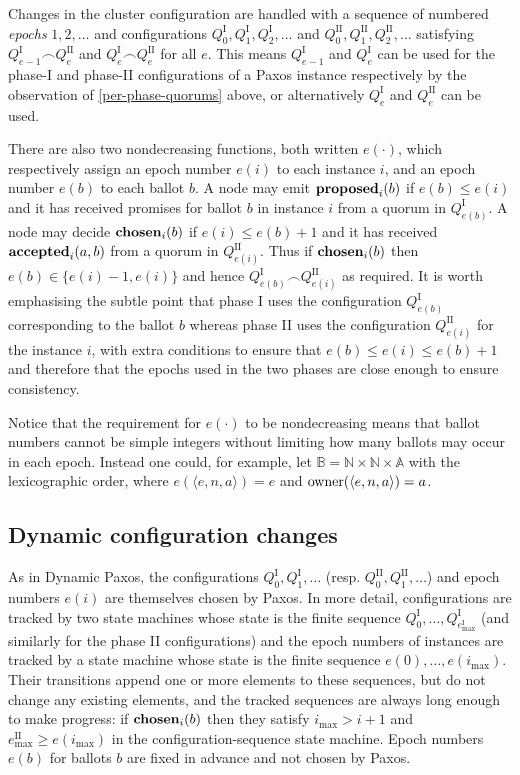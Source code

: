 \documentclass[journal]{IEEEtran}
\begin{document}
Changes in the cluster configuration are handled with a sequence of numbered
\textit{epochs} $1, 2, \ldots$ and configurations $Q^\textrm{I}_0,
Q^\textrm{I}_1, Q^\textrm{I}_2, \ldots$ and $Q^\textrm{II}_0, Q^\textrm{II}_1,
Q^\textrm{II}_2, \ldots$ satisfying $Q^\textrm{I}_{e-1} \frown Q^\textrm{II}_e$
and $Q^\textrm{I}_e \frown Q^\textrm{II}_e$ for all $e$.  This means
$Q^\textrm{I}_{e-1}$ and $Q^\textrm{I}_e$ can be used for the phase-I and
phase-II configurations of a Paxos instance respectively by the observation of
\ref{per-phase-quorums} above, or alternatively $Q^\textrm{I}_e$ and
$Q^\textrm{II}_e$ can be used.

There are also two nondecreasing functions, both written $e(\cdot)$, which
respectively assign an epoch number $e(i)$ to each instance $i$, and an epoch
number $e(b)$ to each ballot $b$. A node may emit $\mathbf{proposed}_{i}(b)$ if $e(b) \le
e(i)$ and it has received promises for ballot $b$ in instance $i$ from a quorum
in $Q^\textrm{I}_{e(b)}$. A node may decide $\mathbf{chosen}_{i}(b)$ if ${e(i) \le
e(b)+1}$ and it has received $\mathbf{accepted}_{i}(a,b)$ from a quorum in
$Q^\textrm{II}_{e(i)}$. Thus if $\mathbf{chosen}_{i}(b)$ then ${e(b) \in \{ e(i)-1, e(i)
\}}$ and hence $Q^\textrm{I}_{e(b)} \frown Q^\textrm{II}_{e(i)}$ as required. It
is worth emphasising the subtle point that phase I uses the configuration
$Q^\textrm{I}_{e(b)}$ corresponding to the ballot $b$ whereas phase II uses the
configuration $Q^\textrm{II}_{e(i)}$ for the instance $i$, with extra conditions
to ensure that $e(b) \le e(i) \le e(b) + 1$ and therefore that the epochs used
in the two phases are close enough to ensure consistency.

Notice that the requirement for $e(\cdot)$ to be nondecreasing means that
ballot numbers cannot be simple integers without limiting how many ballots may
occur in each epoch. Instead one could, for example, let $\mathbb B = \mathbb N
\times \mathbb N \times \mathbb A$ with the lexicographic order, where
$e(\langle e, n, a\rangle) = e$ and $\mathrm{owner}(\langle e, n, a \rangle) = a$.

\subsection{Dynamic configuration changes}

As in Dynamic Paxos, the configurations $Q^\textrm{I}_0, Q^\textrm{I}_1,
\ldots$ (resp. $Q^\textrm{II}_0, Q^\textrm{II}_1, \ldots$) and epoch numbers
$e(i)$ are themselves chosen by Paxos. In more detail, configurations are
tracked by two state machines whose state is the finite sequence
$Q^\textrm{I}_0, \ldots, Q^\textrm{I}_{e^\textrm{I}_\mathrm{max}}$ (and
similarly for the phase II configurations) and the epoch numbers of instances
are tracked by a state machine whose state is the finite sequence $e(0),
\ldots, e(i_\mathrm{max})$.  Their transitions append one or more elements to
these sequences, but do not change any existing elements, and the tracked
sequences are always long enough to make progress: if $\mathbf{chosen}_{i}(b)$ then they
satisfy $i_\mathrm{max} > i+1$ and $e^\textrm{II}_\mathrm{max} \ge
e(i_\mathrm{max})$ in the configuration-sequence state machine. Epoch numbers
$e(b)$ for ballots $b$ are fixed in advance and not chosen by Paxos.
\end{document}

